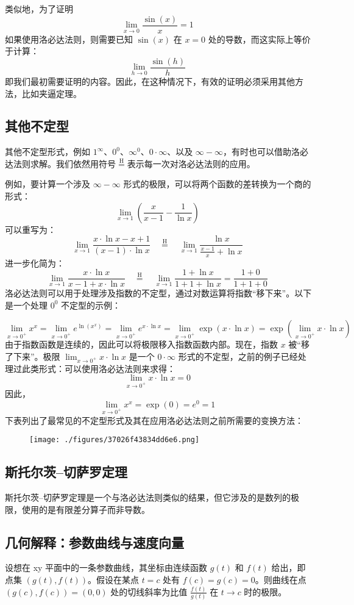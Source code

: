 类似地，为了证明
$$
\lim_{x \to 0} \frac{\sin(x)}{x} = 1~
$$
如果使用洛必达法则，则需要已知 $\sin(x)$ 在 $x=0$ 处的导数，而这实际上等价于计算：
$$
\lim_{h \to 0} \frac{\sin(h)}{h}~
$$
即我们最初需要证明的内容。因此，在这种情况下，有效的证明必须采用其他方法，比如夹逼定理。
\subsection{其他不定型}
其他不定型形式，例如 $1^\infty$、$0^0$、$\infty^0$、$0 \cdot \infty$、以及 $\infty - \infty$，有时也可以借助洛必达法则求解。我们依然用符号$\stackrel{\mathrm{H}}{=}$表示每一次对洛必达法则的应用。

例如，要计算一个涉及 $\infty - \infty$ 形式的极限，可以将两个函数的差转换为一个商的形式：
$$
\lim_{x \to 1} \left( \frac{x}{x - 1} - \frac{1}{\ln x} \right)~
$$
可以重写为：
$$
\lim_{x \to 1} \frac{x \cdot \ln x - x + 1}{(x - 1) \cdot \ln x}
\quad \stackrel{\mathrm{H}}{=}\quad
\lim_{x \to 1} \frac{\ln x}{\frac{x - 1}{x} + \ln x}~
$$
进一步化简为：
$$
\lim_{x \to 1} \frac{x \cdot \ln x}{x - 1 + x \cdot \ln x}
\quad \stackrel{\mathrm{H}}{=}\quad
\lim_{x \to 1} \frac{1 + \ln x}{1 + 1 + \ln x} = \frac{1 + 0}{1 + 1 + 0}~
$$
洛必达法则可以用于处理涉及指数的不定型，通过对数运算将指数“移下来”。以下是一个处理 $0^0$ 不定型的示例：

$$
\lim_{x \to 0^+} x^x = \lim_{x \to 0^+} e^{\ln(x^x)} = \lim_{x \to 0^+} e^{x \cdot \ln x} = \lim_{x \to 0^+} \exp(x \cdot \ln x) = \exp\left( \lim_{x \to 0^+} x \cdot \ln x \right)~
$$
由于指数函数是连续的，因此可以将极限移入指数函数内部。现在，指数 $x$ 被“移了下来”。极限 $\lim_{x \to 0^+} x \cdot \ln x$ 是一个 $0 \cdot \infty$ 形式的不定型，之前的例子已经处理过此类形式：可以使用洛必达法则来求得：
$$
\lim_{x \to 0^+} x \cdot \ln x = 0~
$$
因此，
$$
\lim_{x \to 0^+} x^x = \exp(0) = e^0 = 1~
$$
下表列出了最常见的不定型形式及其在应用洛必达法则之前所需要的变换方法：
\begin{figure}[ht]
\centering
\texttt{[image: ./figures/37026f43834dd6e6.png]}
\caption{} \label{fig_LbdFZ_1}
\end{figure}
\subsection{斯托尔茨–切萨罗定理}
斯托尔茨–切萨罗定理是一个与洛必达法则类似的结果，但它涉及的是数列的极限，使用的是有限差分算子而非导数。
\subsection{几何解释：参数曲线与速度向量}
设想在 xy 平面中的一条参数曲线，其坐标由连续函数 $g(t)$ 和 $f(t)$ 给出，即点集 $(g(t), f(t))$。假设在某点 $t = c$ 处有 $f(c) = g(c) = 0$。则曲线在点 $(g(c), f(c)) = (0, 0)$ 处的切线斜率为比值 $\frac{f(t)}{g(t)}$ 在 $t \to c$ 时的极限。


